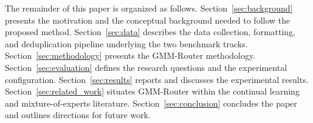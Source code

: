 The remainder of this paper is organized as follows. Section~\ref{sec:background} presents the motivation and the conceptual background needed to follow the proposed method. Section~\ref{sec:data} describes the data collection, formatting, and deduplication pipeline underlying the two benchmark tracks. Section~\ref{sec:methodology} presents the GMM-Router methodology. Section~\ref{sec:evaluation} defines the research questions and the experimental configuration. Section~\ref{sec:results} reports and discusses the experimental results. Section~\ref{sec:related_work} situates GMM-Router within the continual learning and mixture-of-experts literature. Section~\ref{sec:conclusion} concludes the paper and outlines directions for future work.
